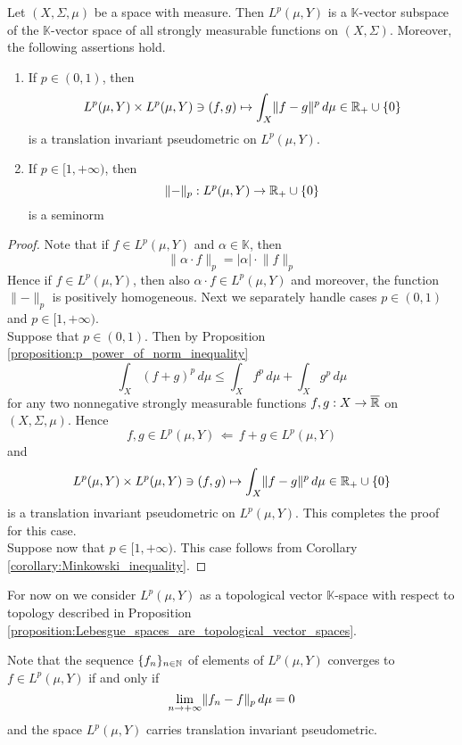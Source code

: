 \begin{proposition}\label{proposition:Lebesgue_spaces_are_topological_vector_spaces}
Let $(X,\Sigma,\mu)$ be a space with measure. Then $L^p(\mu,Y)$ is a $\mathbb{K}$-vector subspace of the $\mathbb{K}$-vector space of all strongly measurable functions on $(X,\Sigma)$. Moreover, the following assertions hold.
\begin{enumerate}[label=\emph{\textbf{(\arabic*)}}, leftmargin=*]
\item If $p \in (0,1)$, then
$$L^p(\mu,Y)\times L^p(\mu,Y) \ni (f,g) \mapsto \int_X\lVert f - g\rVert^p\,d\mu \in {\mathbb R}_+\cup \{0\}$$
is a translation invariant pseudometric on $L^p(\mu,Y)$.
\item If $p \in [1,+\infty)$, then 
$$\lVert-\rVert_p:L^p(\mu,Y)\rightarrow {\mathbb R}_+\cup \{0\}$$
is a seminorm
\end{enumerate}
\end{proposition}
\begin{proof}
Note that if $f\in L^p(\mu,Y)$ and $\alpha \in \mathbb{K}$, then 
$$\lVert \alpha \cdot f\rVert_p = |\alpha|\cdot \lVert f\rVert_p$$
Hence if $f\in L^p(\mu,Y)$, then also $\alpha \cdot f \in L^p(\mu,Y)$ and moreover, the function $\lVert -\rVert_p$ is positively homogeneous. Next we separately handle cases $p \in (0,1)$ and $p \in [1,+\infty)$.\\
Suppose that $p \in (0,1)$. Then by Proposition \ref{proposition:p_power_of_norm_inequality}
$$\int_X\left(f + g\right)^p\,d\mu \leq \int_X f^p\,d\mu + \int_X g^p\,d\mu$$
for any two nonnegative strongly measurable functions $f,g:X\rightarrow \overline{{\mathbb R}}$ on $(X,\Sigma,\mu)$. Hence
$$f,g\in L^p(\mu,Y)\,\Leftarrow\,f+g\in L^p(\mu,Y)$$
and
$$L^p(\mu,Y)\times L^p(\mu,Y) \ni (f,g) \mapsto \int_X\lVert f - g\rVert^p\,d\mu \in {\mathbb R}_+\cup \{0\}$$
is a translation invariant pseudometric on $L^p(\mu,Y)$. This completes the proof for this case.\\
Suppose now that $p\in [1,+\infty)$. This case follows from Corollary \ref{corollary:Minkowski_inequality}.
\end{proof}
\noindent
For now on we consider $L^p(\mu,Y)$ as a topological vector $\mathbb{K}$-space with respect to topology described in Proposition \ref{proposition:Lebesgue_spaces_are_topological_vector_spaces}.

\begin{remark}\label{remark:topology_of_Lebesgue_spaces_is_sequential}
Note that the sequence $\{f_n\}_{n\in {\mathbb N}}$ of elements of $L^p(\mu,Y)$ converges to $f\in L^p(\mu,Y)$ if and only if
$$\lim_{n\rightarrow +\infty}\lVert f_n - f\rVert_p\,d\mu = 0$$
and the space $L^p(\mu,Y)$ carries translation invariant pseudometric.
\end{remark}

